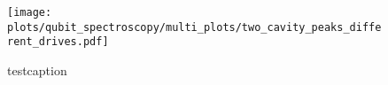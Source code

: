 




\begin{figure}
\centering
\texttt{[image: plots/qubit\_spectroscopy/multi\_plots/two\_cavity\_peaks\_different\_drives.pdf]}
\caption{testcaption}
\label{testlabel}
\end{figure}





